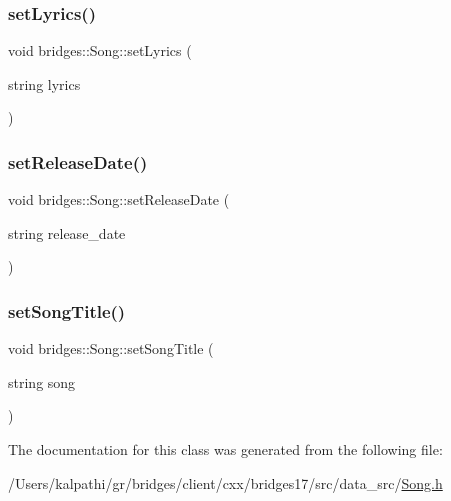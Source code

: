 \mbox{\label{classbridges_1_1_song_ae0a57f15c3f015238c28fe08d1adea5a}} 
\subsubsection{\texorpdfstring{set\+Lyrics()}{setLyrics()}}
{\footnotesize\ttfamily void bridges\+::\+Song\+::set\+Lyrics (\begin{DoxyParamCaption}\item[{string}]{lyrics }\end{DoxyParamCaption})\hspace{0.3cm}{\ttfamily [inline]}}

\mbox{\label{classbridges_1_1_song_a8e9453f5ec33b5d9865788beb4cc68e0}} 
\subsubsection{\texorpdfstring{set\+Release\+Date()}{setReleaseDate()}}
{\footnotesize\ttfamily void bridges\+::\+Song\+::set\+Release\+Date (\begin{DoxyParamCaption}\item[{string}]{release\+\_\+date }\end{DoxyParamCaption})\hspace{0.3cm}{\ttfamily [inline]}}

\mbox{\label{classbridges_1_1_song_aed396fe05fd2bcb61e23ecca0d4a2047}} 
\subsubsection{\texorpdfstring{set\+Song\+Title()}{setSongTitle()}}
{\footnotesize\ttfamily void bridges\+::\+Song\+::set\+Song\+Title (\begin{DoxyParamCaption}\item[{string}]{song }\end{DoxyParamCaption})\hspace{0.3cm}{\ttfamily [inline]}}



The documentation for this class was generated from the following file\+:\begin{DoxyCompactItemize}
\item 
/\+Users/kalpathi/gr/bridges/client/cxx/bridges17/src/data\+\_\+src/\mbox{\hyperlink{_song_8h}{Song.\+h}}\end{DoxyCompactItemize}
